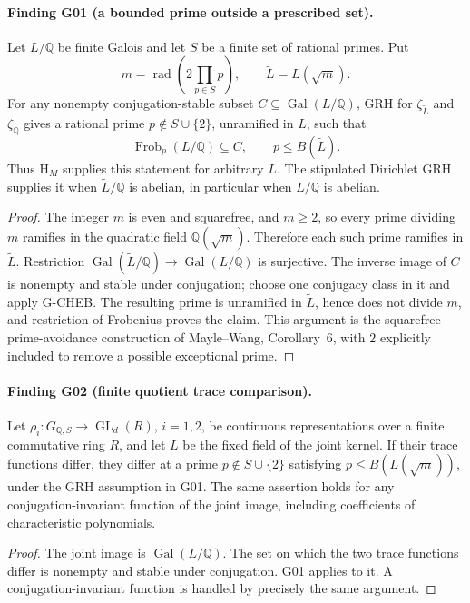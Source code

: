 \paragraph{Finding G01 (a bounded prime outside a prescribed set).}
Let $L/\mathbb Q$ be finite Galois and let $S$ be a finite set of rational primes. Put
\[
 m=\operatorname{rad}\!\left(2\prod_{p\in S}p\right),\qquad
 \widetilde L=L(\sqrt m).
\]
For any nonempty conjugation-stable subset $C\subseteq\operatorname{Gal}(L/\mathbb Q)$, GRH for $\zeta_{\widetilde L}$ and $\zeta_{\mathbb Q}$ gives a rational prime $p\notin S\cup\{2\}$, unramified in $L$, such that
\[
 \operatorname{Frob}_p(L/\mathbb Q)\subseteq C,
 \qquad p\le B(\widetilde L).
\]
Thus $\mathrm{H}_M$ supplies this statement for arbitrary $L$. The stipulated Dirichlet GRH supplies it when $\widetilde L/\mathbb Q$ is abelian, in particular when $L/\mathbb Q$ is abelian.

\begin{proof}
The integer $m$ is even and squarefree, and $m\ge2$, so every prime dividing $m$ ramifies in the quadratic field $\mathbb Q(\sqrt m)$.  Therefore each such prime ramifies in $\widetilde L$.  Restriction $\operatorname{Gal}(\widetilde L/\mathbb Q)\to\operatorname{Gal}(L/\mathbb Q)$ is surjective.  The inverse image of $C$ is nonempty and stable under conjugation; choose one conjugacy class in it and apply G-CHEB.  The resulting prime is unramified in $\widetilde L$, hence does not divide $m$, and restriction of Frobenius proves the claim.  This argument is the squarefree-prime-avoidance construction of Mayle--Wang, Corollary~6, with $2$ explicitly included to remove a possible exceptional prime.
\end{proof}

\paragraph{Finding G02 (finite quotient trace comparison).}
Let $\rho_i:G_{\mathbb Q,S}\to\operatorname{GL}_d(R)$, $i=1,2$, be continuous representations over a finite commutative ring $R$, and let $L$ be the fixed field of the joint kernel. If their trace functions differ, they differ at a prime $p\notin S\cup\{2\}$ satisfying $p\le B(L(\sqrt m))$, under the GRH assumption in G01. The same assertion holds for any conjugation-invariant function of the joint image, including coefficients of characteristic polynomials.

\begin{proof}
The joint image is $\operatorname{Gal}(L/\mathbb Q)$.  The set on which the two trace functions differ is nonempty and stable under conjugation.  G01 applies to it.  A conjugation-invariant function is handled by precisely the same argument.
\end{proof}

